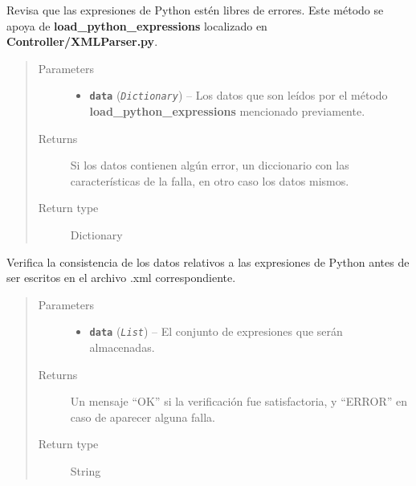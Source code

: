 \documentclass[class=report, crop=false]{standalone}
\begin{document}
\begin{fulllineitems}
\begin{fulllineitems}
\end{fulllineitems}

\begin{fulllineitems}

Revisa que las expresiones de Python estén libres de errores.\break
Este método se apoya de \textbf{load\_python\_expressions} localizado en 
\textbf{Controller/XMLParser.py}.

\begin{quote}\begin{description}
\item[{Parameters}] \leavevmode\begin{itemize}
\item \textbf{\texttt{data}} (\emph{\texttt{Dictionary}}) -- Los datos que son leídos por el método \textbf{load\_python\_expressions} mencionado previamente.
\end{itemize}
\item[{Returns}] \leavevmode
Si los datos contienen algún error, un diccionario con las características de la falla, en otro caso los datos mismos.
\item[{Return type}] \leavevmode
Dictionary
\end{description}\end{quote}

\end{fulllineitems}

\begin{fulllineitems}

Verifica la consistencia de los datos relativos a las
expresiones de Python antes de ser escritos en el 
archivo .xml correspondiente.

\begin{quote}\begin{description}
\item[{Parameters}] \leavevmode\begin{itemize}
\item \textbf{\texttt{data}} (\emph{\texttt{List}}) -- El conjunto de expresiones que serán almacenadas.
\end{itemize}
\item[{Returns}] \leavevmode
Un mensaje ``OK'' si la verificación fue satisfactoria, y ``ERROR'' en caso de aparecer alguna falla.
\item[{Return type}] \leavevmode
String
\end{description}\end{quote}

\end{fulllineitems}

\end{fulllineitems}

\end{document}
